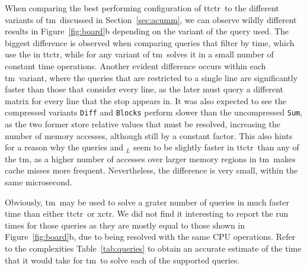     When comparing the best performing configuration of \gls{ttctr}~to the different variants of \gls{tm}~discussed in Section~\ref{sec:acumm}, we can observe wildly different results in Figure~\ref{fig:board}b depending on the variant of the \texttt{\boardX} query used. The biggest difference is observed when comparing queries that filter by time, which use the  in \gls{ttctr}, while for any variant of \gls{tm}~solves it in a small number of constant time operations. Another evident difference occurs within each \gls{tm}~variant, where the queries that are restricted to a single line are significantly faster than those that consider every line, as the later must query a different matrix for every line that the stop appears in. It was also expected to see the compressed variants \texttt{Diff} and \texttt{Blocks} perform slower than the uncompressed \texttt{Sum}, as the two former store relative values that must be resolved, increasing the number of memory accesses, although still by a constant factor. This also hints for a reason why the queries \texttt{\boardX} and \texttt{\boardX$_{L}$} seem to be slightly faster in \gls{ttctr}~than any of the \gls{tm}, as a higher number of accesses over larger memory regions in \gls{tm}~makes cache misses more frequent. Nevertheless, the difference is very small, within the same microsecond.
    
    Obviously, \gls{tm}~may be used to solve a grater number of queries in much faster time than either \gls{ttctr}~or \gls{xctr}. We did not find it interesting to report the run times for those queries as they are mostly equal to those shown in Figure~\ref{fig:board}b, due to being resolved with the same CPU operations. Refer to the complexities Table~\ref{tab:queries} to obtain an accurate estimate of the time that it would take for \gls{tm}~to solve each of the supported queries.
